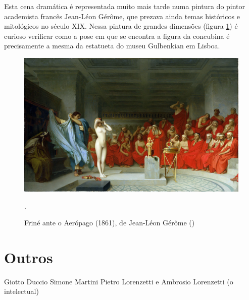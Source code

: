 \documentclass{article}
\begin{document}
Esta cena dramática é representada muito mais tarde numa pintura do
pintor academista francês Jean-Léon Gérôme, que prezava ainda temas
históricos e mitológicos no século XIX. Nessa pintura de grandes
dimensões (figura \ref{fig:3}) é curioso verificar como a pose em que
se encontra a figura da concubina é precisamente a mesma da estatueta
do museu Gulbenkian em Lisboa.

\begin{figure}
\centering\includegraphics[height=0.3\textheight,keepaspectratio]
                          {frine.jpg}
  \caption{Friné ante o Aerópago (1861), de Jean-Léon Gérôme (\cite{gerome})}.
  \label{fig:3}
\end{figure}

\section{Outros}

Giotto
Duccio
Simone Martini
Pietro Lorenzetti e Ambrosio Lorenzetti (o intelectual)

\printbibliography[heading=bibliography,title={Bibliografia}]
\end{document}
